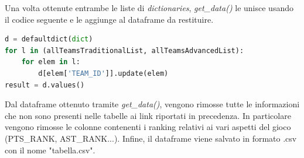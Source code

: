 \documentclass[11pt,a4paper]{article}
\begin{document}
 Una volta ottenute entrambe le liste di \emph{dictionaries}, \emph{get\_data()} le unisce usando il codice seguente e le aggiunge al dataframe da restituire.

\vspace{0.5cm} 
\begin{lstlisting}[language=python,tabsize=1,frame = single]
d = defaultdict(dict)
for l in (allTeamsTraditionalList, allTeamsAdvancedList):
    for elem in l:
        d[elem['TEAM_ID']].update(elem)
result = d.values()
\end{lstlisting}
\vspace{0.5cm}
 
Dal dataframe ottenuto tramite \emph{get\_data()}, vengono rimosse tutte le informazioni che non sono presenti nelle tabelle ai link riportati in precedenza. In particolare vengono rimosse le colonne contenenti i ranking relativi ai vari aspetti del gioco (PTS\_RANK, AST\_RANK...). Infine, il dataframe viene salvato in formato .csv con il nome "tabella.csv".
\end{document}
